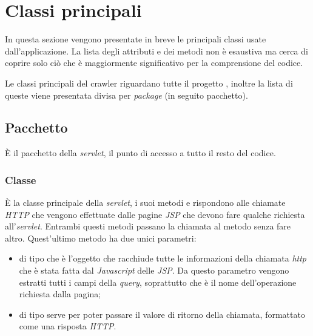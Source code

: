\documentclass[tesi.tex]{subfiles}
\begin{document}
\section{Classi principali}\label{sec:classi}
In questa sezione vengono presentate in breve le principali classi usate dall'applicazione. La lista
degli attributi e dei metodi non \`e esaustiva ma cerca di coprire
solo ci\`o che \`e maggiormente significativo per la comprensione del
codice.

Le classi principali del crawler riguardano tutte il progetto
, inoltre la lista di queste viene presentata divisa
per \emph{package} (in seguito pacchetto).

\subsection{Pacchetto }
\`E il pacchetto della \emph{servlet}, il punto di accesso a tutto il
resto del codice.

\subsubsection{Classe }
\begin{center}
\end{center}
\`E la classe principale della \emph{servlet}, i suoi metodi
 e  rispondono alle chiamate \emph{HTTP} che
vengono effettuate dalle pagine
\emph{JSP} che devono fare qualche richiesta
all'\emph{servlet}. Entrambi questi metodi passano la chiamata al
metodo  senza fare altro. Quest'ultimo metodo ha
due unici parametri:
\begin{itemize}
\item {} di tipo  che \`e
  l'oggetto che racchiude tutte le informazioni della chiamata
  \emph{http} che \`e stata fatta dal \emph{Javascript} delle
  \emph{JSP}. Da questo parametro vengono estratti tutti i campi della
  \emph{query}, soprattutto  che \`e il nome
  dell'operazione richiesta dalla pagina;
\item {} di tipo  serve per
  poter passare il valore di ritorno della chiamata,
  formattato come una risposta \emph{HTTP}.
\end{itemize}
\end{document}
